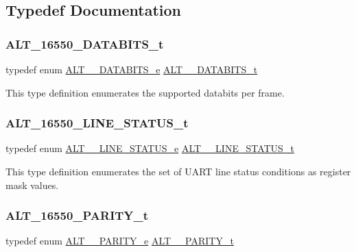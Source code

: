 \subsection{Typedef Documentation}
\mbox{\label{group__UART__LINE_ga1e6b5e04034d586d0a66297b152a43c4}} 
\subsubsection{\texorpdfstring{ALT\_16550\_DATABITS\_t}{ALT\_16550\_DATABITS\_t}}
{\footnotesize\ttfamily typedef enum \mbox{\hyperlink{group__UART__LINE_ga8e9059237616c661191ac9fd517a812e}{A\+L\+T\+\_\+\_\+\+D\+A\+T\+A\+B\+I\+T\+S\+\_\+e}}
 \mbox{\hyperlink{group__UART__LINE_ga1e6b5e04034d586d0a66297b152a43c4}{A\+L\+T\+\_\+\_\+\+D\+A\+T\+A\+B\+I\+T\+S\+\_\+t}}}

This type definition enumerates the supported databits per frame. \mbox{\label{group__UART__LINE_ga2ce8b3524fc9491e21758f2f7bef7557}} 
\subsubsection{\texorpdfstring{ALT\_16550\_LINE\_STATUS\_t}{ALT\_16550\_LINE\_STATUS\_t}}
{\footnotesize\ttfamily typedef enum \mbox{\hyperlink{group__UART__LINE_ga9bd71509496adb0f07549c10d42ff745}{A\+L\+T\+\_\+\_\+\+L\+I\+N\+E\+\_\+\+S\+T\+A\+T\+U\+S\+\_\+e}}
 \mbox{\hyperlink{group__UART__LINE_ga2ce8b3524fc9491e21758f2f7bef7557}{A\+L\+T\+\_\+\_\+\+L\+I\+N\+E\+\_\+\+S\+T\+A\+T\+U\+S\+\_\+t}}}

This type definition enumerates the set of U\+A\+RT line status conditions as register mask values. \mbox{\label{group__UART__LINE_ga40ed81a89ceaf6e4ef0ec49c16415bf3}} 
\subsubsection{\texorpdfstring{ALT\_16550\_PARITY\_t}{ALT\_16550\_PARITY\_t}}
{\footnotesize\ttfamily typedef enum \mbox{\hyperlink{group__UART__LINE_ga8ac3151dbe5902aca34e2a07ff9747b1}{A\+L\+T\+\_\+\_\+\+P\+A\+R\+I\+T\+Y\+\_\+e}}
 \mbox{\hyperlink{group__UART__LINE_ga40ed81a89ceaf6e4ef0ec49c16415bf3}{A\+L\+T\+\_\+\_\+\+P\+A\+R\+I\+T\+Y\+\_\+t}}}

